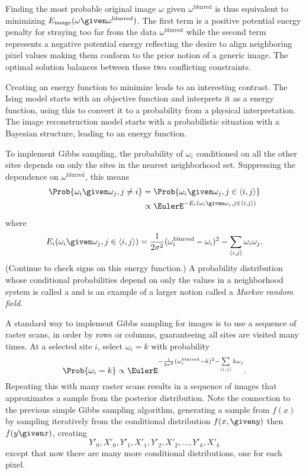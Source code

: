 \documentclass[12pt]{article}
\begin{document}
Finding the most probable original image \( \omega \) given \( \omega^{\text
{blurred}} \) is thus equivalent to minimizing \( E_{\text{image}}(\omega
\given \omega^{\text{blurred}}) \).  The first term is a positive
potential energy
penalty for
straying too far from the data \( \omega^{\text{blurred}} \) while the
second term represents a negative potential energy reflecting
the desire to align neighboring pixel values
making them conform to the prior notion of a generic image.  The optimal
solution balances between these two conflicting constraints.

Creating an energy function to minimize leads to an interesting
contrast.  The Ising model starts
with an objective function and interprets it as a energy function, using
this to convert it to a probability from a physical interpretation.  The
image reconstruction model starts with a probabilistic situation with a
Bayesian structure, leading to an energy function.

To implement Gibbs sampling, the
probability of \( \omega_i \) conditioned on all the other sites depends
on only the sites in the nearest neighborhood set.  Suppressing the
dependence on \( \omega^{\text{blurred}} \), this means
\begin{align*}
    \Prob{\omega_i \given \omega_j, j \ne i }  &= \Prob
    { \omega_i \given \omega_j, j \in \langle i,j \rangle } \\
    & \propto \EulerE^{-E_i(\omega_i \given \omega_j, j \in
    \langle i,j \rangle)}
\end{align*}
where
\[
  E_i(\omega_i \given \omega_j, j \in \langle i,j \rangle) =
  \frac{1}{2\sigma^2}(\omega_i^{\text{blurred}}-\omega_i)^2 -
    \sum\limits_{\langle i, j \rangle} \omega_i\omega_j.
\] (Continue to check signs on this
energy function.) A probability distribution whose conditional probabilities depend on
only the values in a neighborhood system is called a %
and is an example of a larger notion called a \emph{Markov random field}.%

A standard way to implement Gibbs sampling for images is to use a
sequence of raster scans, in order by rows or columns, guaranteeing all
sites are visited many times.  At a selected site \( i \), select \(
\omega_i = k \) with probability
\[
    \Prob{\omega_i = k} \propto \EulerE^{-\frac{1}{2\sigma^2}(\omega_i^{\text
    {blurred}}-k)^2 - \sum\limits_{\langle i, j \rangle} k \omega_j}.
\] Repeating this with many raster scans results in a sequence of images
that approximates a sample from the posterior distribution. Note the
connection to the previous simple Gibbs sampling algorithm, generating a
sample from \( f(x) \) by sampling iteratively from the conditional
distribution \( f(x, \given y) \) then \( f(y \given x) \), creating
\[
    Y'_0, X'_0, Y'_1, X'_1, Y'_2, X'_2, \dots, Y'_k, X'_k
\] except that now there are many more conditional distributions, one
for each pixel.
\end{document}
